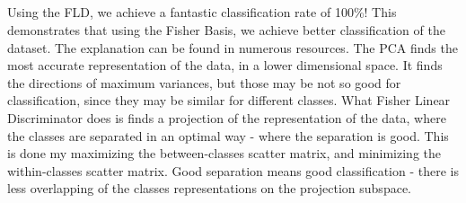 \documentclass[a4paper]{iacas}
\begin{document}
 \subsection{}
Using the FLD, we achieve a fantastic classification rate of 100\%! This demonstrates that using the Fisher Basis, we achieve better classification of the dataset. The explanation can be found in numerous resources.
\newline
The PCA finds the most accurate representation of the data, in a lower dimensional space. It finds the directions of maximum variances, but those may be not so good for classification, since they may be similar for different classes. What Fisher Linear Discriminator does is finds a projection of the representation of the data, where the classes are separated in an optimal way - where the separation is good. This is done my maximizing the between-classes scatter matrix, and minimizing the within-classes scatter matrix.  Good separation means good classification - there is less overlapping of the classes representations on the projection subspace.
\end{document}
